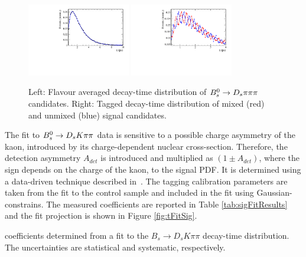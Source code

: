\begin{figure}[h]
        \centering
                \includegraphics[width=0.4\textwidth, height = !]{figs/timeFit/norm_taggingCalib/h_t.pdf}
                \includegraphics[width=0.4\textwidth, height = !]{figs/timeFit/norm_taggingCalib/h_t_mixed.pdf}
                \caption{
Left: Flavour averaged decay-time distribution of ${{B}^0_{s}}\rightarrow{\ensuremath{{D}_{s}}}{\ensuremath{\pi}}{\ensuremath{\pi}}{\ensuremath{\pi}}$ candidates.
Right: Tagged decay-time distribution of mixed (red) and unmixed (blue) signal candidates.}
                \label{fig:tFitNorm}
\end{figure}

The fit to ${{B}^0_{s}}\rightarrow{\ensuremath{{D}_{s}}}{\ensuremath{K}}{\ensuremath{\pi}}{\ensuremath{\pi}}$ data is sensitive to a possible charge asymmetry of the kaon, introduced by its charge-dependent nuclear cross-section. 
Therefore, the detection asymmetry $A_{det}$ is introduced and multiplied as $(1 \pm A_{det})$, where the sign depends on the charge of the kaon, to the signal PDF. 
It is determined using a data-driven technique described in~\cite{Davis:2310213}.
The tagging calibration parameters are taken from the fit to the control sample and included in the fit using Gaussian-constrains.
The measured \CP coefficients are reported in Table \ref{tab:sigFitResults} and the fit projection is shown in Figure \ref{fig:tFitSig}.


\begin{table}[h]
\centering
\caption{\CP coefficients determined from a fit to the $B_s \to D_s K \pi\pi$ decay-time distribution. The uncertainties are statistical and systematic, respectively.}
        \renewcommand{\arraystretch}{1.5}
        
\label{tab:sigFitResults}
\end{table}


